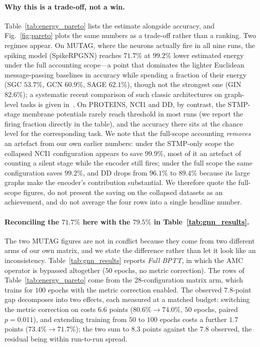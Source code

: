 \documentclass[a4paper,fleqn]{cas-dc}
\begin{document}
\paragraph{Why this is a trade-off, not a win.} Table~\ref{tab:energy_pareto} lists the estimate alongside accuracy, and Fig.~\ref{fig:pareto} plots the same numbers as a trade-off rather than a ranking. Two regimes appear. On MUTAG, where the neurons actually fire in all nine runs, the spiking model (SpikeRPGNN) reaches $71.7\%$ at $99.2\%$ lower estimated energy under the full accounting scope---a point that dominates the lighter Euclidean message-passing baselines in accuracy while spending a fraction of their energy (SGC $53.7\%$, GCN $60.9\%$, SAGE $62.1\%$), though not the strongest one (GIN $82.6\%$); a systematic recent comparison of such classic architectures on graph-level tasks is given in~\citep{Luo25}. On PROTEINS, NCI1 and DD, by contrast, the STMP-stage membrane potentials rarely reach threshold in most runs (we report the firing fraction directly in the table), and the accuracy there sits at the chance level for the corresponding task. We note that the full-scope accounting \emph{removes} an artefact from our own earlier numbers: under the STMP-only scope the collapsed NCI1 configuration appears to save $99.9\%$, most of it an artefact of counting a silent stage while the encoder still fires; under the full scope the same configuration saves $99.2\%$, and DD drops from $96.1\%$ to $89.4\%$ because its large graphs make the encoder's contribution substantial. We therefore quote the full-scope figures, do not present the saving on the collapsed datasets as an achievement, and do not average the four rows into a single headline number.

\paragraph{Reconciling the $71.7\%$ here with the $79.5\%$ in Table~\protect\ref{tab:gnn_results}.} The two MUTAG figures are not in conflict because they come from two different arms of our own matrix, and we state the difference rather than let it look like an inconsistency. Table~\ref{tab:gnn_results} reports \emph{Full BPTT}, in which the AMC operator is bypassed altogether ($50$ epochs, no metric correction). The rows of Table~\ref{tab:energy_pareto} come from the 28-configuration matrix arm, which trains for $100$ epochs with the metric correction enabled. The observed $7.8$-point gap decomposes into two effects, each measured at a matched budget: switching the metric correction on costs $6.6$ points ($80.6\% \to 74.0\%$, $50$ epochs, paired $p{=}0.011$), and extending training from $50$ to $100$ epochs costs a further $1.7$ points ($73.4\% \to 71.7\%$); the two sum to $8.3$ points against the $7.8$ observed, the residual being within run-to-run spread.
\end{document}

